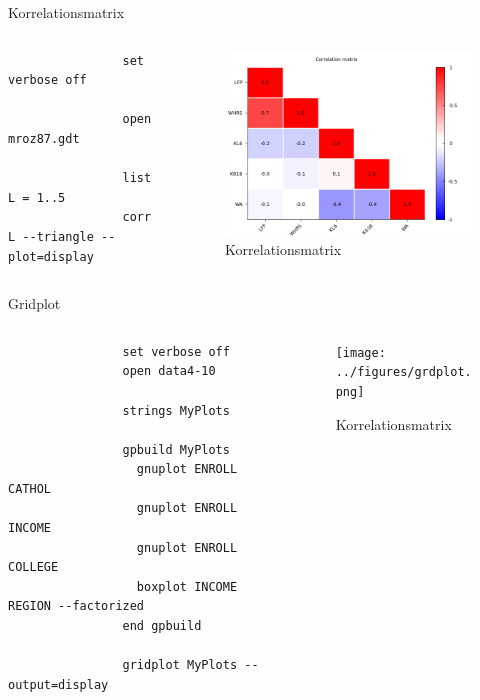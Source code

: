 \documentclass{beamer}[11pt]
\begin{document}
\begin{frame}[fragile]{Korrelationsmatrix}
	\begin{columns}[T] %
		\scriptsize
		\begin{column}{.45\textwidth}
			\begin{verbatim}
				set verbose off

				open mroz87.gdt

				list L = 1..5
				corr L --triangle --plot=display
			\end{verbatim}
		\end{column}

		\begin{column}{.55\textwidth}
			\begin{figure}
				\includegraphics[width=1.0\textwidth]{../figures/correl_triangle.png}
				\caption{Korrelationsmatrix}
			\end{figure}
	  \end{column}
	\end{columns}
\end{frame}


\begin{frame}[fragile]{Gridplot}
	\begin{columns}[T] %
		\scriptsize
		\begin{column}{.45\textwidth}
			\begin{verbatim}
				set verbose off
				open data4-10

				strings MyPlots

				gpbuild MyPlots
				  gnuplot ENROLL CATHOL
				  gnuplot ENROLL INCOME
				  gnuplot ENROLL COLLEGE
				  boxplot INCOME REGION --factorized
				end gpbuild

				gridplot MyPlots --output=display
			\end{verbatim}
		\end{column}

		\begin{column}{.55\textwidth}
			\begin{figure}
				\texttt{[image: ../figures/grdplot.png]}
				\caption{Korrelationsmatrix}
			\end{figure}
	  \end{column}
	\end{columns}
\end{frame}
\end{document}

